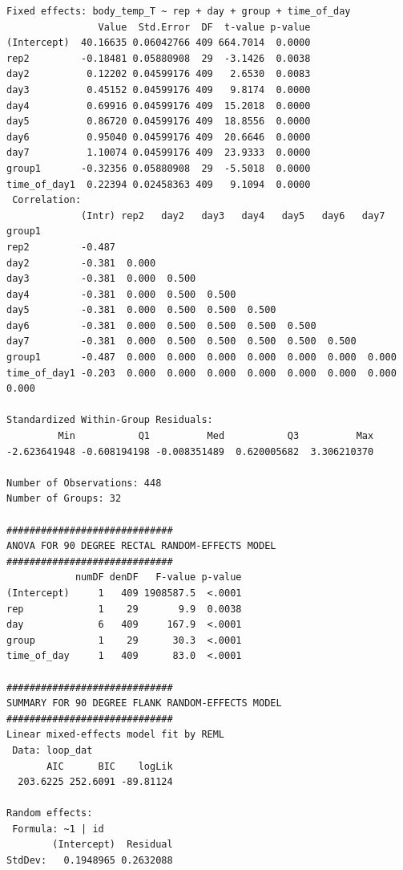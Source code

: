 \documentclass[a4paper, 10pt, titlepage]{article}
\begin{document}
\begin{lstlisting}[basicstyle = \footnotesize \ttfamily]
Fixed effects: body_temp_T ~ rep + day + group + time_of_day 
                Value  Std.Error  DF  t-value p-value
(Intercept)  40.16635 0.06042766 409 664.7014  0.0000
rep2         -0.18481 0.05880908  29  -3.1426  0.0038
day2          0.12202 0.04599176 409   2.6530  0.0083
day3          0.45152 0.04599176 409   9.8174  0.0000
day4          0.69916 0.04599176 409  15.2018  0.0000
day5          0.86720 0.04599176 409  18.8556  0.0000
day6          0.95040 0.04599176 409  20.6646  0.0000
day7          1.10074 0.04599176 409  23.9333  0.0000
group1       -0.32356 0.05880908  29  -5.5018  0.0000
time_of_day1  0.22394 0.02458363 409   9.1094  0.0000
 Correlation: 
             (Intr) rep2   day2   day3   day4   day5   day6   day7   group1
rep2         -0.487                                                        
day2         -0.381  0.000                                                 
day3         -0.381  0.000  0.500                                          
day4         -0.381  0.000  0.500  0.500                                   
day5         -0.381  0.000  0.500  0.500  0.500                            
day6         -0.381  0.000  0.500  0.500  0.500  0.500                     
day7         -0.381  0.000  0.500  0.500  0.500  0.500  0.500              
group1       -0.487  0.000  0.000  0.000  0.000  0.000  0.000  0.000       
time_of_day1 -0.203  0.000  0.000  0.000  0.000  0.000  0.000  0.000  0.000

Standardized Within-Group Residuals:
         Min           Q1          Med           Q3          Max 
-2.623641948 -0.608194198 -0.008351489  0.620005682  3.306210370 

Number of Observations: 448
Number of Groups: 32 

############################# 
ANOVA FOR 90 DEGREE RECTAL RANDOM-EFFECTS MODEL 
#############################
            numDF denDF   F-value p-value
(Intercept)     1   409 1908587.5  <.0001
rep             1    29       9.9  0.0038
day             6   409     167.9  <.0001
group           1    29      30.3  <.0001
time_of_day     1   409      83.0  <.0001

############################# 
SUMMARY FOR 90 DEGREE FLANK RANDOM-EFFECTS MODEL 
#############################
Linear mixed-effects model fit by REML
 Data: loop_dat 
       AIC      BIC    logLik
  203.6225 252.6091 -89.81124

Random effects:
 Formula: ~1 | id
        (Intercept)  Residual
StdDev:   0.1948965 0.2632088


\end{lstlisting}
\end{document}
